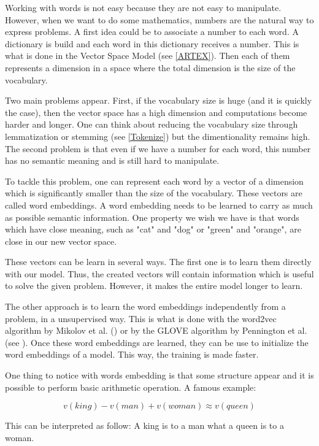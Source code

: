 \documentclass[11pt,a4paper,oldfontcommands]{memoir}
\begin{document}
Working with words is not easy because they are not easy to manipulate. However, when we want to do some mathematics, numbers are the natural way to express problems. A first idea could be to associate a number to each word. A dictionary is build and each word in this dictionary receives a number. This is what is done in the Vector Space Model (see \ref{ARTEX}). Then each of them represents a dimension in a space where the total dimension is the size of the vocabulary.

Two main problems appear. First, if the vocabulary size is huge (and it is quickly the case), then the vector space has a high dimension and computations become harder and longer. One can think about reducing the vocabulary size through lemmatization or stemming (see \ref{Tokenize}) but the dimentionality remains high. The second problem is that even if we have a number for each word, this number has no semantic meaning and is still hard to manipulate.

To tackle this problem, one can represent each word by a vector of a dimension which is significantly smaller than the size of the vocabulary. These vectors are called word embeddings. A word embedding needs to be learned to carry as much as possible semantic information. One property we wish we have is that words which have close meaning, such as "cat" and "dog" or "green" and "orange", are close in our new vector space.

These vectors can be learn in several ways. The first one is to learn them directly with our model. Thus, the created vectors will contain information which is useful to solve the given problem. However, it makes the entire model longer to learn.

The other approach is to learn the word embeddings independently from a problem, in a unsupervised way. This is what is done with the word2vec algorithm by Mikolov et al. (\cite{DBLP:journals/corr/MikolovSCCD13}) or by the GLOVE algorithm by Pennington et al. (see \cite{DBLP:conf/emnlp/PenningtonSM14}). Once these word embeddings are learned, they can be use to initialize the word embeddings of a model. This way, the training is made faster.

One thing to notice with words embedding is that some structure appear and it is possible to perform basic arithmetic operation. A famous example:

\[ v(king) - v(man) + v(woman) \approx v(queen) \]

This can be interpreted as follow: A king is to a man what a queen is to a woman.
\end{document}
